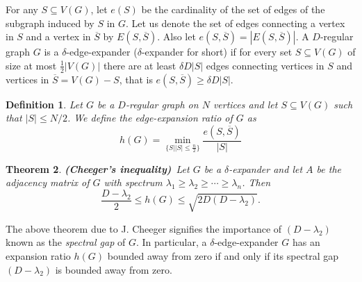 \documentclass{article}
\newtheorem{theorem}{Theorem}[section]
\newtheorem{definition}[theorem]{Definition}
\begin{document}
For any $S\subseteq V(G)$, let $e(S)$ be the cardinality of the set of edges of the subgraph induced by $S$ in $G$. Let us denote the set of edges connecting a vertex in $S$ and a vertex in $\overline{S}$ by $E(S,\overline{S})$. Also let $e(S,\overline{S})=|E(S,\overline{S})|$. A $D$-regular graph $G$ is a $\delta$-edge-expander ($\delta$-expander for short) if for every set $S\subseteq V(G)$ of size at most $\frac{1}{2}|V(G)|$ there are at least $\delta D|S|$ edges connecting vertices in $S$ and vertices in $\overline{S}=V(G)-S$, that is $e(S,\overline{S})\geq\delta D|S|$.
\begin{definition}%
Let $G$ be a $D$-regular graph on $N$ vertices and let $S\subseteq V(G)$ such that $|S|\leq N/2$. We define the edge-expansion ratio of $G$ as
\[
h(G)=\min _{\{S||S|\leq \frac{n}{2}\}}\frac{e(S,\overline{S})}{|S|}
\]
\end{definition}

\begin{theorem}{\rm {\bf (Cheeger's inequality)}\cite{Che1970}}\label{cheeger}
~Let $G$ be a $\delta$-expander and let $A$ be the adjacency matrix of $G$ with spectrum $\lambda _1\geq \lambda _2\geq\cdots\geq \lambda _n$. Then
\[
\frac{D-\lambda _2}{2}\leq h(G)\leq \sqrt{2D(D-\lambda _2)}.
\]
\end{theorem}
The above theorem due to J. Cheeger \cite{Che1970} signifies the importance of $(D-\lambda _2)$ known as the {\it spectral gap} of $G$. In particular, a $\delta$-edge-expander $G$ has an expansion ratio $h(G)$ bounded away from zero if and only if its spectral gap $(D-\lambda _2)$  is bounded away from zero.
\end{document}
